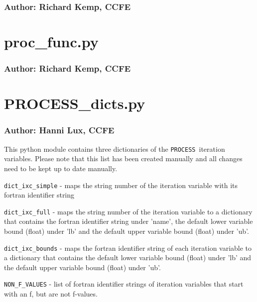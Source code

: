 \documentclass[11pt,a4paper]{report}
\newcommand{\process}{\mbox{\texttt{PROCESS}}}
\begin{document}
\subsubsection*{Author: Richard Kemp, CCFE}

\section{proc\_func.py}

\subsubsection*{Author: Richard Kemp, CCFE}

\section{PROCESS\_dicts.py}

\subsubsection*{Author: Hanni Lux, CCFE}

This python module contains three
dictionaries of the \process\ iteration variables. Please note that this list
has been created manually and all changes need to be kept up to date manually.

\begin{description}

\item{\texttt{dict\_ixc\_simple}} - maps the string number of the iteration
  variable with its fortran identifier string

\item{\texttt{dict\_ixc\_full}} - maps the string number of the iteration
  variable to a dictionary that contains the fortran identifier string under
  'name', the default lower variable bound (float) under 'lb' and the default
  upper variable bound (float) under 'ub'. 

\item{\texttt{dict\_ixc\_bounds}} - maps the fortran identifier string of each
  iteration variable to a dictionary that contains the default lower variable
  bound (float) under 'lb' and the default upper variable bound (float) under
  'ub'.

\item{\texttt{NON\_F\_VALUES}} - list of fortran identifier strings of
  iteration variables that start with an f, but are not f-values.

\end{description}
\end{document}
